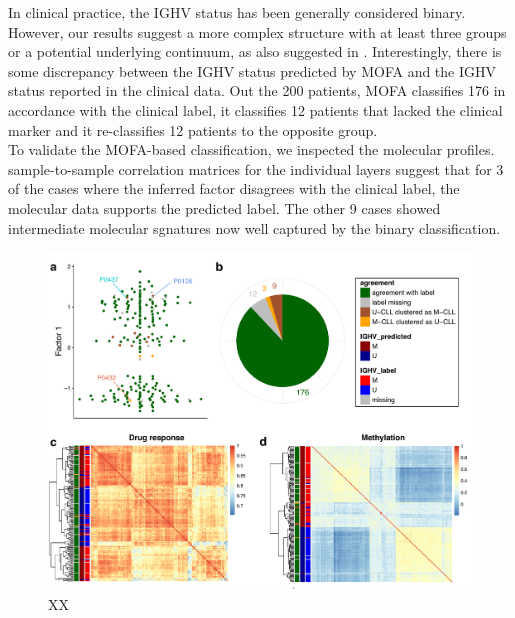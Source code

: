 In clinical practice, the IGHV status has been generally considered binary. However, our results suggest a more complex structure with at least three groups or a potential underlying continuum, as also suggested in \cite{Oakes2016,Queiros2015}. Interestingly, there is some discrepancy between the IGHV status predicted by MOFA and the IGHV status reported in the clinical data. Out the 200 patients, MOFA classifies 176 in accordance with the clinical label, it classifies 12 patients that lacked the clinical marker and it re-classifies 12 patients to the opposite group.\\
To validate the MOFA-based classification, we inspected the molecular profiles. sample-to-sample correlation matrices for the individual layers suggest that for 3 of the cases where the inferred factor disagrees with the clinical label, the molecular data supports the predicted label. The other 9 cases showed intermediate molecular sgnatures now well captured by the binary classification.

\begin{figure}[H]
	\centering 	
	\includegraphics[width=1.0\textwidth]{MOFA_IGHV_outlier}
	\caption{XX}
	\label{fig:MOFA_IGHV_outlier}
\end{figure}



